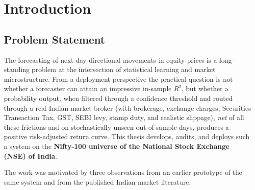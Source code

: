 \chapter{Introduction} \label{chapter1}

\section{Problem Statement}

The forecasting of next-day directional movements in equity prices is a long-standing problem at the intersection of statistical learning and market microstructure. From a deployment perspective the practical question is not whether a forecaster can attain an impressive in-sample $R^2$, but whether a probability output, when filtered through a confidence threshold and routed through a real Indian-market broker (with brokerage, exchange charges, Securities Transaction Tax, GST, SEBI levy, stamp duty, and realistic slippage), \emph{net} of all these frictions and on stochastically unseen out-of-sample days, produces a positive risk-adjusted return curve. This thesis develops, audits, and deploys such a system on the \textbf{Nifty-100 universe of the National Stock Exchange (NSE) of India}.

The work was motivated by three observations from an earlier prototype of the same system and from the published Indian-market literature.

